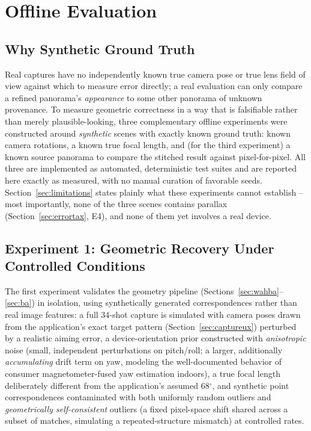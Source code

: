 \documentclass[11pt]{article}
\newcommand{\Deg}{\ensuremath{^{\circ}}}
\begin{document}
\section{Offline Evaluation}
\label{sec:evaluation}

\subsection{Why Synthetic Ground Truth}

Real captures have no independently known true camera pose or true lens field of view against which to measure error directly; a real evaluation can only compare a refined panorama's \emph{appearance} to some other panorama of unknown provenance. To measure geometric correctness in a way that is falsifiable rather than merely plausible-looking, three complementary offline experiments were constructed around \emph{synthetic} scenes with exactly known ground truth: known camera rotations, a known true focal length, and (for the third experiment) a known source panorama to compare the stitched result against pixel-for-pixel. All three are implemented as automated, deterministic test suites and are reported here exactly as measured, with no manual curation of favorable seeds. Section~\ref{sec:limitations} states plainly what these experiments cannot establish -- most importantly, none of the three scenes contains parallax (Section~\ref{sec:errortax}, E4), and none of them yet involves a real device.

\subsection{Experiment 1: Geometric Recovery Under Controlled Conditions}
\label{sec:eval1}

The first experiment validates the geometry pipeline (Sections~\ref{sec:wahba}--\ref{sec:ba}) in isolation, using synthetically generated correspondences rather than real image features: a full 34-shot capture is simulated with camera poses drawn from the application's exact target pattern (Section~\ref{sec:captureux}) perturbed by a realistic aiming error, a device-orientation prior constructed with \emph{anisotropic} noise (small, independent perturbations on pitch/roll; a larger, additionally \emph{accumulating} drift term on yaw, modeling the well-documented behavior of consumer magnetometer-fused yaw estimation indoors), a true focal length deliberately different from the application's assumed $68\Deg$, and synthetic point correspondences contaminated with both uniformly random outliers and \emph{geometrically self-consistent} outliers (a fixed pixel-space shift shared across a subset of matches, simulating a repeated-structure mismatch) at controlled rates.
\end{document}
